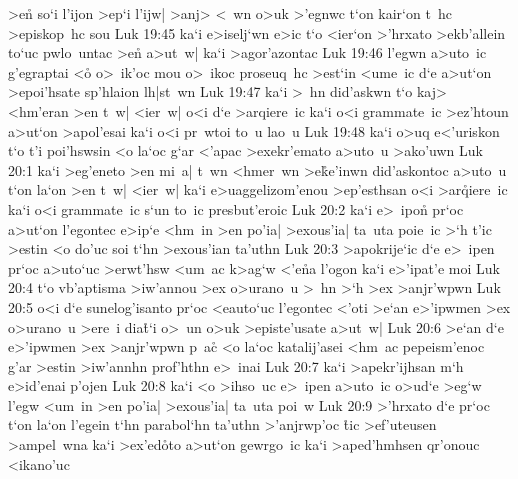 >en\r{}
so`i
l'ijon
>ep`i
l'ijw|
>anj>
<~wn
o>uk
>'egnwc
t`on
kair`on
t~hc
>episkop~hc
sou\bibvsend
\vs Luk 19:45
ka`i
e>iselj`wn
e>ic
t`o
<ier`on
>'hrxato
>ekb'allein
to`uc
pwlo~untac
>en\r{}
a>ut~w|
ka`i
>agor'azontac\bibvsend
\vs Luk 19:46
l'egwn
a>uto~ic
g'egraptai
<o\r{}
o>~ik'oc
mou
o>~ikoc
proseuq~hc
>est`in
<ume~ic
d`e
a>ut`on
>epoi'hsate
sp'hlaion
lh|st~wn\bibvsend
\vs Luk 19:47
ka`i
>~hn
did'askwn
t`o
kaj>
<hm'eran
>en
t~w|
<ier~w|
o<i
d`e
>arqiere~ic
ka`i
o<i
grammate~ic
>ez'htoun
a>ut`on
>apol'esai
ka`i
o<i
pr~wtoi
to~u
lao~u\bibvsend
\vs Luk 19:48
ka`i
o>uq
e<'uriskon
t`o
t'i
poi'hswsin
<o
la`oc
g`ar
<'apac
>exekr'emato
a>uto~u
>ako'uwn\bibvsend
\vs Luk 20:1
ka`i
>eg'eneto
>en
mi~a|
t~wn
<hmer~wn
>e\r{k}e'inwn
did'askontoc
a>uto~u
t`on
la`on
>en
t~w|
<ier~w|
ka`i
e>uaggelizom'enou
>ep'esthsan
o<i
>ar\r{q}iere~ic
ka`i
o<i
grammate~ic
s`un
to~ic
presbut'eroic\bibvsend
\vs Luk 20:2
ka`i
e>~ipon\r{}
pr`oc
a>ut`on
l'egontec
e>ip`e
<hm~in
>en
po'ia|
>exous'ia|
ta~uta
poie~ic
>`h
t'ic
>estin
<o
do'uc
soi
t`hn
>exous'ian
ta'uthn\bibvsend
\vs Luk 20:3
>apokrije`ic
d`e
e>~ipen
pr`oc
a>uto`uc
>erwt'hsw
<um~ac
k>ag`w
<'e\r{n}a
l'ogon
ka`i
e>'ipat'e
moi\bibvsend
\vs Luk 20:4
t`o
vb'aptisma
>iw'annou
>ex
o>urano~u
>~hn
>`h
>ex
>anjr'wpwn\bibvsend
\vs Luk 20:5
o<i
d`e
sunelog'isanto
pr`oc
<eauto`uc
l'egontec
<'oti
>e`an
e>'ipwmen
>ex
o>urano~u
>ere~i
dia\r{t}`i
o>~un
o>uk
>episte'usate
a>ut~w|\bibvsend
\vs Luk 20:6
>e`an
d`e
e>'ipwmen
>ex
>anjr'wpwn
p~ac\r{}
<o
la`oc
katalij'asei
<hm~ac
pepeism'enoc
g'ar
>estin
>iw'annhn
prof'hthn
e>~inai\bibvsend
\vs Luk 20:7
ka`i
>apekr'ijhsan
m`h
e>id'enai
p'ojen\bibvsend
\vs Luk 20:8
ka`i
<o
>ihso~uc
e>~ipen
a>uto~ic
o>ud`e
>eg`w
l'egw
<um~in
>en
po'ia|
>exous'ia|
ta~uta
poi~w\bibvsend
\vs Luk 20:9
>'hrxato
d`e
pr`oc
t`on
la`on
l'egein
t`hn
parabol`hn
ta'uthn
>'anjrwp'oc
\r{t}ic
>ef'uteusen
>ampel~wna
ka`i
>ex'ed\r{o}to
a>ut`on
gewrgo~ic
ka`i
>aped'hmhsen
qr'onouc
<ikano'uc\bibvsend
